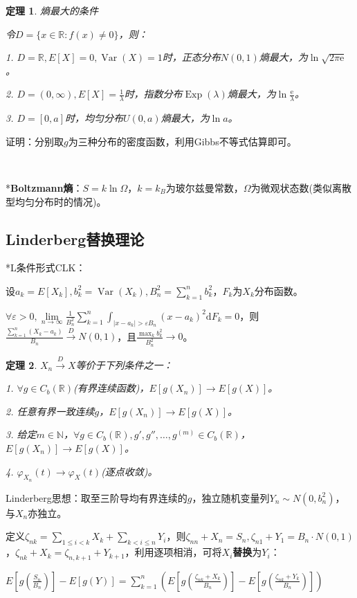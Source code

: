 \documentclass[a4paper,UTF8,fontset=windows]{ctexart}
\newtheorem{thm}{定理}[section]
\DeclareMathOperator{\Exp}{Exp}
\DeclareMathOperator{\Var}{Var}
\newcommand{\con}[1]{\stackrel{#1}{\longrightarrow}}
\begin{document}
\begin{thm} 熵最大的条件

令$D=\{x\in\mathbb{R}:f(x)\ne0\}$，则：

1. $D=\mathbb{R},E[X]=0,\Var(X)=1$时，正态分布$N(0,1)$熵最大，为$\ln\sqrt{2\pi\mathrm{e}}$。

2. $D=(0,\infty),E[X]=\frac{1}{\lambda}$时，指数分布$\Exp(\lambda)$熵最大，为$\ln\frac{\mathrm{e}}{\lambda}$。

3. $D=[0,a]$时，均匀分布$U(0,a)$熵最大，为$\ln{a}$。
\end{thm}

证明：分别取$g$为三种分布的密度函数，利用Gibbs不等式估算即可。

~

*\textbf{Boltzmann熵}：$S=k\ln\Omega$，$k=k_B$为玻尔兹曼常数，$\Omega$为微观状态数(类似离散型均匀分布时的情况)。

\subsection{Linderberg替换理论}
*L条件形式CLK：

设$a_k=E[X_k],b_k^2=\Var(X_k),B_n^2=\sum_{k=1}^nb_k^2$，$F_k$为$X_k$分布函数。

$\forall\varepsilon>0,\lim\limits_{n\to\infty}\frac{1}{B_n^2}\sum_{k=1}^n\int_{|x-a_k|>\varepsilon B_n}(x-a_k)^2\mathrm{d}F_k=0$，则$\frac{\sum_{k=1}^n(X_k-a_k)}{B_n}\con{D}N(0,1)$，且$\frac{\max_kb_k^2}{B_n^2}\con{}0$。

\begin{thm} $X_n\con{D}X$等价于下列条件之一：

1. $\forall g\in C_b(\mathbb{R})$(有界连续函数)，$E[g(X_n)]\con{}E[g(X)]$。

2.	任意有界一致连续$g$，$E[g(X_n)]\con{}E[g(X)]$。

3. 给定$m\in\mathbb{N}$，$\forall g\in C_b(\mathbb{R}),g',g'',\dots,g^{(m)}\in C_b(\mathbb{R})$，$E[g(X_n)]\con{}E[g(X)]$。

4. $\varphi_{X_n}(t)\con{}\varphi_X(t)$(逐点收敛)。
\end{thm}

Linderberg思想：取至三阶导均有界连续的$g$，独立随机变量列$Y_n\sim N(0,b_n^2)$，与$X_n$亦独立。

定义$\zeta_{nk}=\sum_{1\le i<k}X_k+\sum_{k<i\le n}Y_i$，则$\zeta_{nn}+X_n=S_n,\zeta_{n1}+Y_1=B_n\cdot N(0,1)$，$\zeta_{nk}+X_k=\zeta_{n,k+1}+Y_{k+1}$，利用逐项相消，可将$X_i$\textbf{替换}为$Y_i$：

$E\left[g\left(\frac{S_n}{B_n}\right)\right]-E[g(Y)]=\sum_{k=1}^n\left(E\left[g\left(\frac{\zeta_{nk}+X_k}{B_n}\right)\right]-E\left[g\left(\frac{\zeta_{nk}+Y_k}{B_n}\right)\right]\right)$
\end{document}

